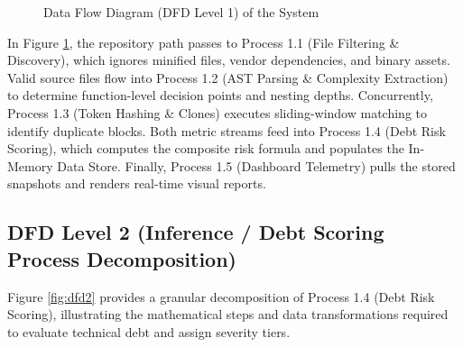 \begin{figure}[htbp]
\caption{Data Flow Diagram (DFD Level 1) of the System}
\label{fig:dfd1}
\end{figure}

In Figure \ref{fig:dfd1}, the repository path passes to Process 1.1 (File Filtering \& Discovery), which ignores minified files, vendor dependencies, and binary assets. Valid source files flow into Process 1.2 (AST Parsing \& Complexity Extraction) to determine function-level decision points and nesting depths. Concurrently, Process 1.3 (Token Hashing \& Clones) executes sliding-window matching to identify duplicate blocks. Both metric streams feed into Process 1.4 (Debt Risk Scoring), which computes the composite risk formula and populates the In-Memory Data Store. Finally, Process 1.5 (Dashboard Telemetry) pulls the stored snapshots and renders real-time visual reports.

\subsection{DFD Level 2 (Inference / Debt Scoring Process Decomposition)}
Figure \ref{fig:dfd2} provides a granular decomposition of Process 1.4 (Debt Risk Scoring), illustrating the mathematical steps and data transformations required to evaluate technical debt and assign severity tiers.

